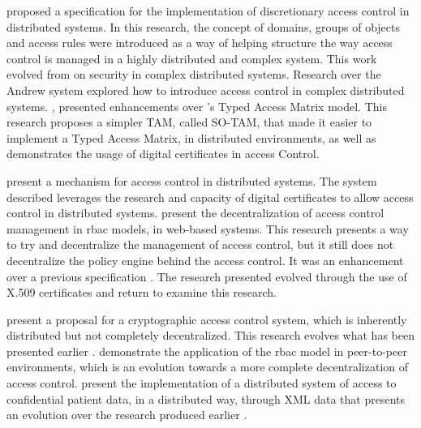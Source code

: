\citeauthor{moffett_specifying_1990} \cite{moffett_specifying_1990} proposed a specification for the implementation of discretionary access control in distributed systems. In this research, the concept of domains, groups of objects and access rules were introduced as a way of helping structure the way access control is managed in a highly distributed and complex system. This work evolved from \citeauthor{satyanarayanan_integrating_1989} \cite{satyanarayanan_integrating_1989} on security in complex distributed systems. Research over the Andrew system \cite{satyanarayanan_integrating_1989} explored how to introduce access control in complex distributed systems. \citeauthor{sandhu_implementation_1992} \cite{sandhu_implementation_1992}, presented enhancements over  \citeauthor{sandhu_typed_1992}’s \cite{sandhu_typed_1992} Typed Access Matrix model. This research proposes a simpler TAM, called SO-TAM, that made it easier to implement a Typed Access Matrix, in distributed environments, as well as demonstrates the usage of digital certificates in access Control.

\citeauthor{johnston_authorization_1998} \cite{johnston_authorization_1998} present a mechanism for access control in distributed systems. The system described leverages the research and capacity of digital certificates to allow access control in distributed systems. \citeauthor{sandhu_decentralized_1998} \cite{sandhu_decentralized_1998} present the decentralization of access control management in \gls{rbac} models, in web-based systems. This research presents a way to try and decentralize the management of access control, but it still does not decentralize the policy engine behind the access control. It was an enhancement over a previous specification \cite{barkley_role_1997}. The research presented \cite{sandhu_decentralized_1998} evolved through the use of X.509 certificates \cite{park_smart_1999} and \citeauthor{park_role-based_2001} \cite{park_role-based_2001} return to examine this research.

\citeauthor{harrington_cryptographic_2003} \cite{harrington_cryptographic_2003} present a proposal for a cryptographic access control system, which is inherently distributed but not completely decentralized. This research evolves what has been presented earlier \cite{satyanarayanan_integrating_1989}. \citeauthor{park_role-based_2003} \cite{park_role-based_2003} demonstrate the application of the \gls{rbac} model in peer-to-peer environments, which is an evolution towards a more complete decentralization of access control. \citeauthor{abiteboul_electronic_2004} \cite{abiteboul_electronic_2004} present the implementation of a distributed system of access to confidential patient data, in a distributed way, through XML data that presents an evolution over the research produced earlier \cite{damiani_fine-grained_2002}.

